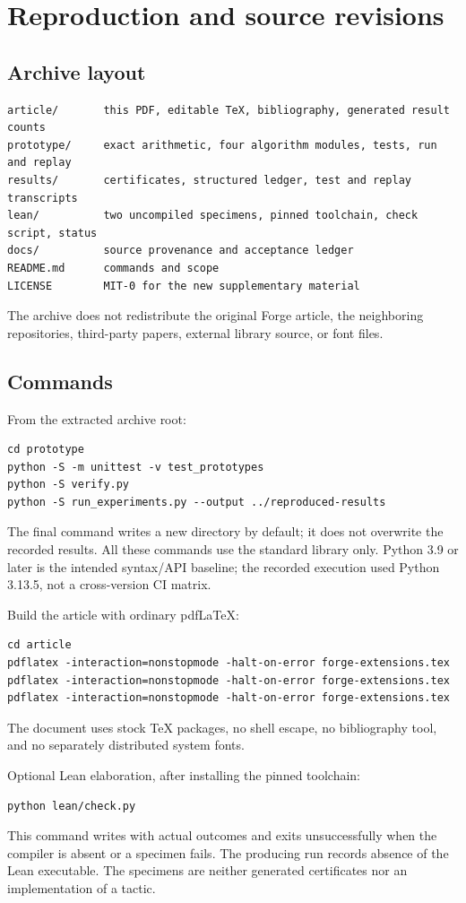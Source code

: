 \section{Reproduction and source revisions}
\label{app:repro}

\subsection{Archive layout}
\begin{lstlisting}
article/       this PDF, editable TeX, bibliography, generated result counts
prototype/     exact arithmetic, four algorithm modules, tests, run and replay
results/       certificates, structured ledger, test and replay transcripts
lean/          two uncompiled specimens, pinned toolchain, check script, status
docs/          source provenance and acceptance ledger
README.md      commands and scope
LICENSE        MIT-0 for the new supplementary material
\end{lstlisting}
The archive does not redistribute the original Forge article, the neighboring
repositories, third-party papers, external library source, or font files.

\subsection{Commands}
From the extracted archive root:
\begin{lstlisting}
cd prototype
python -S -m unittest -v test_prototypes
python -S verify.py
python -S run_experiments.py --output ../reproduced-results
\end{lstlisting}
The final command writes a new directory by default; it does not overwrite the
recorded results. All these commands use the standard library only. Python 3.9
or later is the intended syntax/API baseline; the recorded execution used
Python 3.13.5, not a cross-version CI matrix.

Build the article with ordinary pdfLaTeX:
\begin{lstlisting}
cd article
pdflatex -interaction=nonstopmode -halt-on-error forge-extensions.tex
pdflatex -interaction=nonstopmode -halt-on-error forge-extensions.tex
pdflatex -interaction=nonstopmode -halt-on-error forge-extensions.tex
\end{lstlisting}
The document uses stock TeX packages, no shell escape, no bibliography tool,
and no separately distributed system fonts.

Optional Lean elaboration, after installing the pinned toolchain:
\begin{lstlisting}
python lean/check.py
\end{lstlisting}
This command writes  with actual outcomes and exits
unsuccessfully when the compiler is absent or a specimen fails. The producing
run records absence of the Lean executable. The specimens are neither generated
certificates nor an implementation of a tactic.

